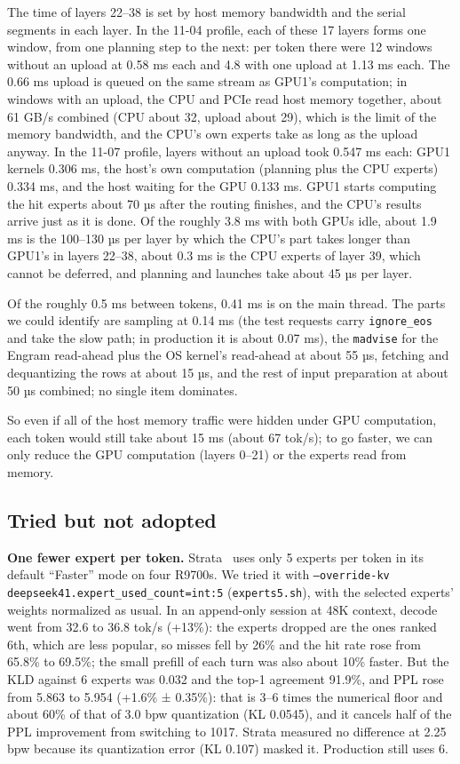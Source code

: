 \documentclass[11pt,a4paper]{article}
\newcommand{\code}[1]{\texttt{#1}}
\newcommand{\tps}{tok/s}
\begin{document}
The time of layers 22--38 is set by host memory bandwidth and the serial segments in each layer. In the 11-04 profile, each of these 17 layers forms one window, from one planning step to the next: per token there were 12 windows without an upload at 0.58 ms each and 4.8 with one upload at 1.13 ms each. The 0.66 ms upload is queued on the same stream as GPU1's computation; in windows with an upload, the CPU and PCIe read host memory together, about 61 GB/s combined (CPU about 32, upload about 29), which is the limit of the memory bandwidth, and the CPU's own experts take as long as the upload anyway. In the 11-07 profile, layers without an upload took 0.547 ms each: GPU1 kernels 0.306 ms, the host's own computation (planning plus the CPU experts) 0.334 ms, and the host waiting for the GPU 0.133 ms. GPU1 starts computing the hit experts about 70 µs after the routing finishes, and the CPU's results arrive just as it is done. Of the roughly 3.8 ms with both GPUs idle, about 1.9 ms is the 100--130 µs per layer by which the CPU's part takes longer than GPU1's in layers 22--38, about 0.3 ms is the CPU experts of layer 39, which cannot be deferred, and planning and launches take about 45 µs per layer.

Of the roughly 0.5 ms between tokens, 0.41 ms is on the main thread. The parts we could identify are sampling at 0.14 ms (the test requests carry \code{ignore\_eos} and take the slow path; in production it is about 0.07 ms), the \code{madvise} for the Engram read-ahead plus the OS kernel's read-ahead at about 55 µs, fetching and dequantizing the rows at about 15 µs, and the rest of input preparation at about 50 µs combined; no single item dominates.

So even if all of the host memory traffic were hidden under GPU computation, each token would still take about 15 ms (about 67 \tps{}); to go faster, we can only reduce the GPU computation (layers 0--21) or the experts read from memory.

\subsection{Tried but not adopted}
\label{sec:notadopted}

\textbf{One fewer expert per token.} Strata~\cite{strata} uses only 5 experts per token in its default ``Faster'' mode on four R9700s. We tried it with \code{--override-kv deepseek41.expert\_used\_count=int:5} (\code{experts5.sh}), with the selected experts' weights normalized as usual. In an append-only session at 48K context, decode went from 32.6 to 36.8 \tps{} (+13\%): the experts dropped are the ones ranked 6th, which are less popular, so misses fell by 26\% and the hit rate rose from 65.8\% to 69.5\%; the small prefill of each turn was also about 10\% faster. But the KLD against 6 experts was 0.032 and the top-1 agreement 91.9\%, and PPL rose from 5.863 to 5.954 (+1.6\% ± 0.35\%): that is 3--6 times the numerical floor and about 60\% of that of 3.0 bpw quantization (KL 0.0545), and it cancels half of the PPL improvement from switching to 1017. Strata measured no difference at 2.25 bpw because its quantization error (KL 0.107) masked it. Production still uses 6.
\end{document}
